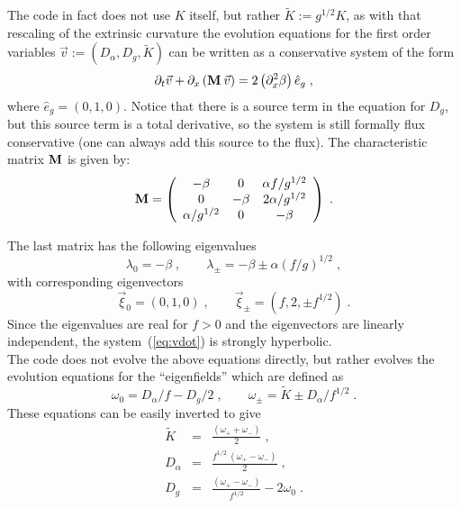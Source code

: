 \documentclass[12pt]{article}
\begin{document}
The code in fact does not use $K$ itself, but rather \mbox{$\tilde{K}
:= g^{1/2} K$}, as with that rescaling of the extrinsic curvature the
evolution equations for the first order variables $\vec{v}:=(D_\alpha,
D_g, \tilde{K} )$ can be written as a conservative system of the form
\begin{equation}
\partial_t \vec{v} + \partial_x \left( {\bf M} \: \vec{v} \right) =
2 \left( \partial^2_x \beta \right) \hat{e}_g \; ,
\label{eq:vdot}
\end{equation}
where $\hat{e}_g=(0,1,0)$.  Notice that there is a source term in the
equation for $D_g$, but this source term is a total derivative, so the
system is still formally flux conservative (one can always add this
source to the flux). The characteristic matrix ${\bf M}$ is given by:
\begin{equation}
{\bf M} = \left( \begin{array}{ccc}
- \beta          & 0        & \alpha f / g^{1/2} \\
0                & - \beta  & 2 \alpha / g^{1/2} \\
\alpha / g^{1/2} & 0        & - \beta
\end{array} \right) \; .
\label{eq:matrixM}
\end{equation}

The last matrix has the following eigenvalues
\begin{equation}
\lambda_0 = - \beta \; , \qquad
\lambda_\pm = - \beta \pm \alpha \left( f / g \right)^{1/2} \; ,
\label{eq:eigenvalues}
\end{equation}
with corresponding eigenvectors
\begin{equation}
\vec{\xi}_0 = \left( 0 , 1 , 0 \right) \; , \qquad
\vec{\xi}_\pm = \left( f , 2 , \pm f^{1/2} \right) \; .
\label{eq:eigenvectors}
\end{equation}
Since the eigenvalues are real for $f>0$ and the eigenvectors are
linearly independent, the system~(\ref{eq:vdot}) is strongly
hyperbolic. \\

The code does not evolve the above equations directly, but rather
evolves the evolution equations for the ``eigenfields'' which
are defined as
\begin{equation}
\omega_0 = D_\alpha / f - D_g / 2 \; , \qquad
\omega_\pm = \tilde{K} \pm D_\alpha / f^{1/2} \; .
\label{eq:eigenfunc}
\end{equation}
These equations can be easily inverted to give
\begin{eqnarray}
\tilde{K} &=& \frac{\left( \omega_+ + \omega_- \right)}{2} \; , \\
D_\alpha &=& \frac{f^{1/2} \: \left( \omega_+ - \omega_- \right)}{2} \; , \\
D_g &=& \frac{\left( \omega_+ - \omega_- \right)}{f^{1/2}} - 2 \omega_0 \; .
\end{eqnarray}
\end{document}
